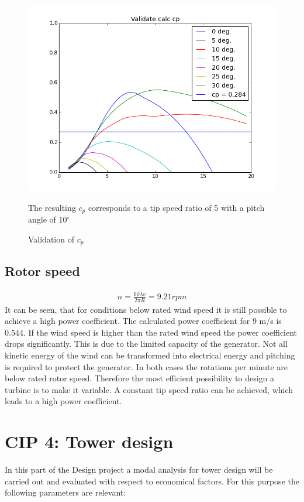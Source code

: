 \documentclass[10pt]{article}
\begin{document}
\begin{figure}[H]
\centering
\includegraphics[width=1\linewidth]{../CIP_3/WT_Perf/Output/validated_cp.png}
\caption{Validation of $c_p$}
\label{fig:validate}
The resulting $c_p$ corresponds to a tip speed ratio of 5 with a pitch angle of 10$^\circ$
\end{figure} 
\subsection{Rotor speed}
\begin{align*}
n = \frac{60 \lambda v}{2 \pi R} = 9.21 rpm
\end{align*}
It can be seen, that for conditions below rated wind speed it is still possible to achieve a high power coefficient. The calculated power coefficient for 9 m/s is 0.544. If the wind speed is higher than the rated wind speed the power coefficient drops significantly. This is due to the limited capacity of the generator. Not all kinetic energy of the wind can be transformed into electrical energy and pitching is required to protect the generator. 
In both cases the rotations per minute are below rated rotor speed. Therefore the most efficient possibility to design a turbine is to make it variable. A constant tip speed ratio can be achieved, which leads to a high power coefficient.
\newpage
\section{CIP 4: Tower design}

In this part of the Design project a modal analysis for tower design will be carried out and evaluated with respect to economical factors. For this purpose the following parameters are relevant:
\end{document}

